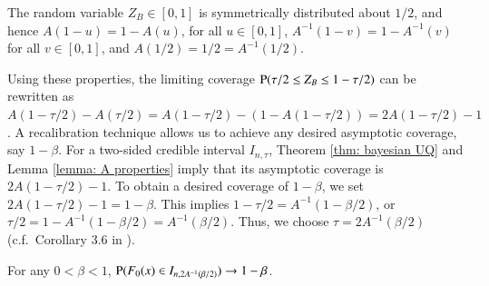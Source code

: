 \begin{lemma}\label{lemma: A properties} 
	The random variable $Z_B \in [0,1]$ is symmetrically distributed about $1/2$, and hence $A(1-u) = 1 - A(u)$, for all $u \in [0,1]$, $A^{-1}(1-v) = 1 - A^{-1}(v)$ for all $v \in [0,1]$, and $A(1/2) = 1/2 = A^{-1}(1/2)$.
\end{lemma}
Using these properties, the limiting coverage $\mathrm{P}(\tau/2 \le Z_B \le 1-\tau/2)$ can be rewritten as $A(1-\tau/2) - A(\tau/2) = A(1-\tau/2) - (1-A(1-\tau/2)) = 2A(1-\tau/2) - 1$. A recalibration technique allows us to achieve any desired asymptotic coverage, say $1-\beta$. For a two-sided credible interval $I_{n,\tau}$, Theorem \ref{thm: bayesian UQ} and Lemma \ref{lemma: A properties} imply that its asymptotic coverage is $2A(1-\tau/2)-1$. To obtain a desired coverage of $1-\beta$, we set $2A(1-\tau/2)-1 = 1-\beta$. This implies $1-\tau/2 = A^{-1}(1-\beta/2)$, or $\tau/2 = 1 - A^{-1}(1-\beta/2) = A^{-1}(\beta/2)$. Thus, we choose $\tau = 2A^{-1}(\beta/2)$ (c.f.\ Corollary 3.6 in \cite{54}). 
\begin{corollary}\label{cor: coverage}
	For any $0 < \beta < 1$, $\mathrm{P} (F_0(x) \in I_{n,2A^{-1}(\beta/2)}) \to 1-\beta$.
\end{corollary}

